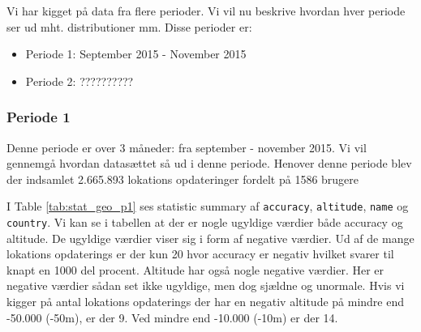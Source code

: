 Vi har kigget på data fra flere perioder. Vi vil nu beskrive hvordan hver periode ser ud mht. distributioner mm. Disse perioder er: 
\begin{itemize}
\item Periode 1: September 2015 - November 2015
\item Periode 2: ??????????
\end{itemize}

\subsubsection{Periode 1}
Denne periode er over 3 måneder: fra september - november 2015. Vi vil gennemgå hvordan datasættet så ud i denne periode. 
Henover denne periode blev der indsamlet 2.665.893 lokations opdateringer fordelt på 1586 brugere

I Table \ref{tab:stat_geo_p1} ses statistic summary af \texttt{accuracy}, \texttt{altitude}, \texttt{name} og \texttt{country}.
Vi kan se i tabellen at der er nogle ugyldige værdier både accuracy og altitude. De ugyldige værdier viser sig i form af negative værdier. Ud af de mange lokations opdaterings er der kun 20 hvor accuracy er negativ hvilket svarer til knapt en 1000 del procent. Altitude har også nogle negative værdier. Her er negative værdier sådan set ikke ugyldige, men dog sjældne og unormale. Hvis vi kigger på antal lokations opdaterings der har en negativ altitude på mindre end -50.000 (-50m), er der 9. Ved mindre end -10.000 (-10m) er der 14.

